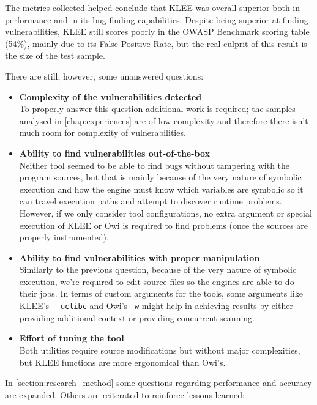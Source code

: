 The metrics collected helped conclude that KLEE was overall superior both in performance and in its bug-finding capabilities. Despite being superior at finding vulnerabilities, KLEE still scores poorly in the OWASP Benchmark scoring table (54\%), mainly due to its False Positive Rate, but the real culprit of this result is the size of the test sample.

There are still, however, some unanswered questions:
\begin{itemize}
	\item \textbf{Complexity of the vulnerabilities detected}\\
	To properly answer this question additional work is required; the samples analysed in \cref{chap:experiences} are of low complexity and therefore there isn't much room for complexity of vulnerabilities.
	\item \textbf{Ability to find vulnerabilities out-of-the-box}\\
	Neither tool seemed to be able to find bugs without tampering with the program sources, but that is mainly because of the very nature of symbolic execution and how the engine must know which variables are symbolic so it can travel execution paths and attempt to discover runtime problems.
	However, if we only consider tool configurations, no extra argument or special execution of KLEE or Owi is required to find problems (once the sources are properly instrumented).
	\item \textbf{Ability to find vulnerabilities with proper manipulation}\\
	Similarly to the previous question, because of the very nature of symbolic execution, we're required to edit source files so the engines are able to do their jobs.
	In terms of custom arguments for the tools, some arguments like KLEE's \lstinline$--uclibc$ and Owi's \lstinline$-w$ might help in achieving results by either providing additional context or providing concurrent scanning.
	\item \textbf{Effort of tuning the tool}\\
	Both utilities require source modifications but without major complexities, but KLEE functions are more ergonomical than Owi's.
\end{itemize}

In \cref{section:research_method}  some questions regarding performance and accuracy are expanded. Others are reiterated to reinforce lessons learned:

